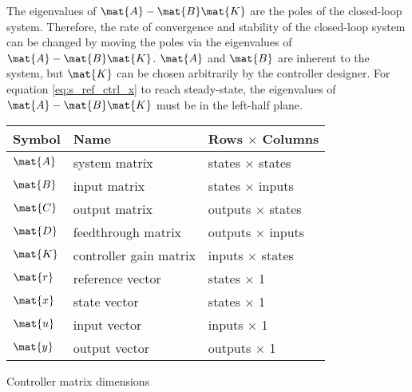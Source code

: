 The eigenvalues of $\mat{A} - \mat{B}\mat{K}$ are the poles of the closed-loop
\gls{system}. Therefore, the rate of convergence and stability of the
closed-loop \gls{system} can be changed by moving the poles via the eigenvalues
of $\mat{A} - \mat{B}\mat{K}$. $\mat{A}$ and $\mat{B}$ are inherent to the
\gls{system}, but $\mat{K}$ can be chosen arbitrarily by the controller
designer. For equation \eqref{eq:s_ref_ctrl_x} to reach steady-state, the
eigenvalues of $\mat{A} - \mat{B}\mat{K}$ must be in the left-half plane.
\begin{booktable}
  \begin{tabular}{|lll|}
    \hline
    \rowcolor{headingbg}
    \textbf{Symbol} & \textbf{Name} & \textbf{Rows $\times$ Columns} \\
    \hline
    $\mat{A}$ & system matrix & states $\times$ states \\
    $\mat{B}$ & input matrix & states $\times$ inputs \\
    $\mat{C}$ & output matrix & outputs $\times$ states \\
    $\mat{D}$ & feedthrough matrix & outputs $\times$ inputs \\
    $\mat{K}$ & controller gain matrix & inputs $\times$ states \\
    $\mat{r}$ & \gls{reference} vector & states $\times$ 1 \\
    $\mat{x}$ & state vector & states $\times$ 1 \\
    $\mat{u}$ & input vector & inputs $\times$ 1 \\
    $\mat{y}$ & output vector & outputs $\times$ 1 \\
    \hline
  \end{tabular}
  \caption{Controller matrix dimensions}
\end{booktable}
